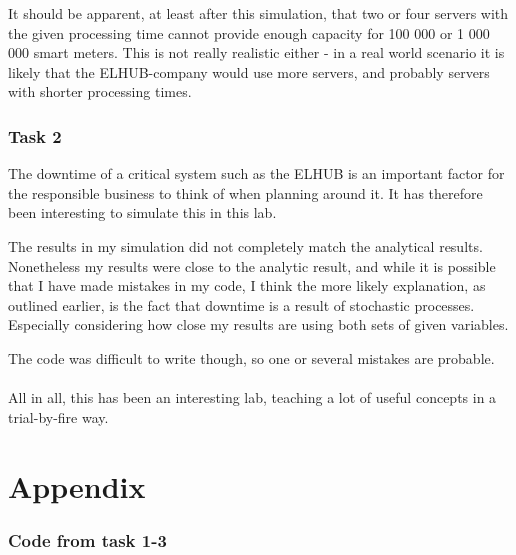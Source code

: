 \documentclass[11pt]{article}
\begin{document}
It should be apparent, at least after this simulation, that two or four servers with the given processing time cannot provide enough capacity for 100 000 or 1 000 000 smart meters. This is not really realistic either - in a real world scenario it is likely that the ELHUB-company would use more servers, and probably servers with shorter processing times.

\subsubsection{Task 2}

The downtime of a critical system such as the ELHUB is an important factor for the responsible business to think of when planning around it. It has therefore been interesting to simulate this in this lab.

The results in my simulation did not completely match the analytical results. Nonetheless my results were close to the analytic result, and while it is possible that I have made mistakes in my code, I think the more likely explanation, as outlined earlier, is the fact that downtime is a result of stochastic processes. Especially considering how close my results are using both sets of given variables.

The code was difficult to write though, so one or several mistakes are probable.
\\
\\

All in all, this has been an interesting lab, teaching a lot of useful concepts in a trial-by-fire way. 

\newpage
\section*{Appendix}

\subsubsection{Code from task 1-3}
\end{document}
